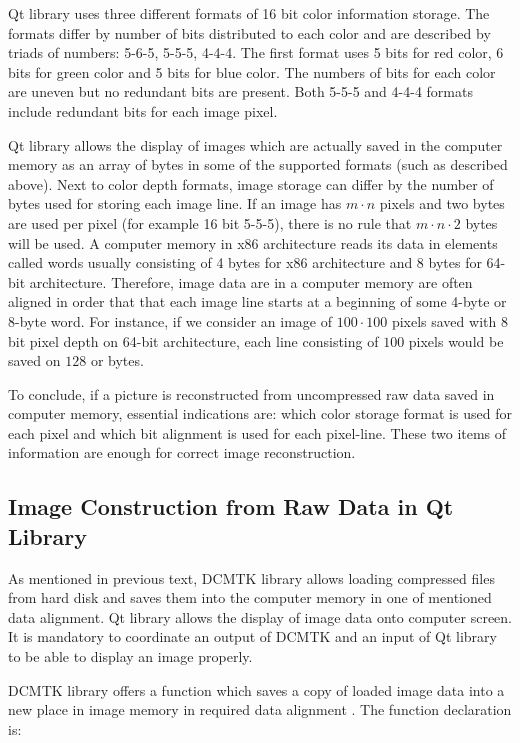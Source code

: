 Qt library uses three different formats of 16 bit color information storage. The formats differ by number of bits distributed to each color and are described by triads of numbers: 5-6-5, 5-5-5, 4-4-4. The first format uses 5 bits for red color, 6 bits for green color and 5 bits for blue color. The numbers of bits for each color are uneven but no redundant bits are present. Both 5-5-5 and 4-4-4 formats include redundant bits for each image pixel\cite{fileformatencyclo}.

Qt library allows the display of images which are actually saved in the computer memory as an array of bytes in some of the supported formats (such as described above). Next to color depth formats, image storage can differ by the number of bytes used for storing each image line. If an image has $m \cdot n$ pixels and two bytes are used per pixel (for example 16 bit 5-5-5), there is no rule that $m \cdot n \cdot 2$ bytes will be used. A computer memory in x86 architecture reads its data in elements called words usually consisting of 4 bytes for x86 architecture and 8 bytes for 64-bit architecture. Therefore, image data are in a computer memory are often aligned in order that that each image line starts at a beginning of some 4-byte or 8-byte word\cite{memoryalignment}. For instance, if we consider an image of $100 \cdot 100$ pixels saved with 8 bit pixel depth on 64-bit architecture, each line consisting of $100$ pixels would be saved on $128$ or bytes.

To conclude, if a picture is reconstructed from uncompressed raw data saved in computer memory, essential indications are: which color storage format is used for each pixel and which bit alignment is used for each pixel-line. These two items of information are enough for correct image reconstruction.

\subsection{Image Construction from Raw Data in Qt Library}
As mentioned in previous text, DCMTK library allows loading compressed files from hard disk and saves them into the computer memory in one of mentioned data alignment. Qt library allows the display of image data onto computer screen. It is mandatory to coordinate an output of DCMTK and an input of Qt library to be able to display an image properly.

DCMTK library offers a function which saves a copy of loaded image data into a new place in image memory in required data alignment \cite{dcmtksupport}. The function declaration is:

